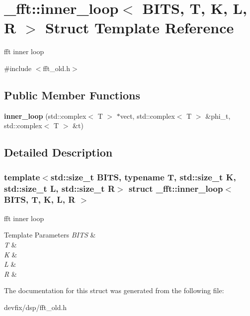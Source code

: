 \hypertarget{struct__fft_1_1inner__loop}{}\section{\+\_\+fft\+:\+:inner\+\_\+loop$<$ B\+I\+TS, T, K, L, R $>$ Struct Template Reference}
\label{struct__fft_1_1inner__loop}


fft inner loop  




{\ttfamily \#include $<$fft\+\_\+old.\+h$>$}

\subsection*{Public Member Functions}
\begin{DoxyCompactItemize}
\item 
\mbox{\label{struct__fft_1_1inner__loop_a24d9bcda13d11b9f68d7156360c252c6}} 
{\bfseries inner\+\_\+loop} (std\+::complex$<$ T $>$ $\ast$vect, std\+::complex$<$ T $>$ \&phi\+\_\+t, std\+::complex$<$ T $>$ \&t)
\end{DoxyCompactItemize}


\subsection{Detailed Description}
\subsubsection*{template$<$std\+::size\+\_\+t B\+I\+TS, typename T, std\+::size\+\_\+t K, std\+::size\+\_\+t L, std\+::size\+\_\+t R$>$\newline
struct \+\_\+fft\+::inner\+\_\+loop$<$ B\+I\+T\+S, T, K, L, R $>$}

fft inner loop 


\begin{DoxyTemplParams}{Template Parameters}
{\em B\+I\+TS} & \\
\hline
{\em T} & \\
\hline
{\em K} & \\
\hline
{\em L} & \\
\hline
{\em R} & \\
\hline
\end{DoxyTemplParams}


The documentation for this struct was generated from the following file\+:\begin{DoxyCompactItemize}
\item 
devfix/dsp/fft\+\_\+old.\+h\end{DoxyCompactItemize}
